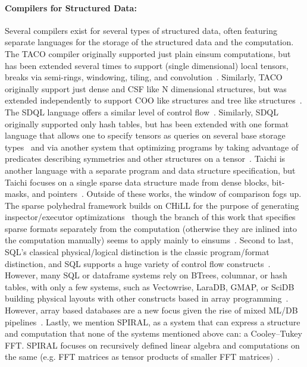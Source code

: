 \paragraph{ Compilers for Structured Data:}
Several compilers exist for several types of structured data, often featuring separate languages for the storage of the structured data and the computation.
%
The TACO compiler originally supported just plain einsum computations, but has been extended several times to support (single dimensional) local tensors, breaks via semi-rings, windowing, tiling, and convolution~\cite{kjolstad_tensor_2017, kjolstad_tensor_2019, senanayake2020sparse, henry_compilation_2021,won2023unified}.
%
Similarly, TACO originally support just dense and CSF like N dimensional structures, but was extended independently to support COO like structures and tree like structures~\cite{kjolstad_tensor_2017, chou2018format, chou2022compilation}.
%
The SDQL language offers a similar level of control flow~\cite{shaikhha2022functional}.
%
Similarly, SDQL originally supported only hash tables, but has been extended with one format language that allows one to specify tensors as queries on several base storage types~\cite{schleich2023optimizing} and via another system that optimizing programs by taking advantage of predicates describing symmetries and other structures on a tensor~\cite{ghorbani2023compiling}.
%
Taichi is another language with a separate program and data structure specification, but Taichi focuses on a single sparse data structure made from dense blocks, bit-masks, and pointers~\cite{hu_taichi_2019}.
%
Outside of these works, the window of comparison fogs up.
%
The sparse polyhedral framework builds on CHiLL for the purpose of generating inspector/executor optimizations~\cite{strout2018sparse} though the branch of this work that specifies sparse formats separately from the computation (otherwise they are inlined into the computation manually) seems to apply mainly to einsums~\cite{zhao2022polyhedral}.
%
Second to last, SQL's classical physical/logical distinction is the classic program/format distinction, and SQL supports a huge variety of control flow constructs~\cite{kotlyar1997relational, date1989guide}.
%
However, many SQL or dataframe systems rely on BTrees, columnar, or hash tables, with only a few systems, such as Vectowrise, LaraDB, GMAP, or SciDB building physical layouts with other constructs based in array programming~\cite{boncz2012vectorwise,hutchison2017laradb,  tsatalos1996gmap, stonebraker2013scidb}.
%
However, array based databases are a new focus given the rise of mixed ML/DB pipelines~\cite{baumann2021array,luo2018scalable}.
%
Lastly, we mention SPIRAL, as a system that can express a structure and computation that none of the systems mentioned above can: a Cooley–Tukey FFT. 
%
SPIRAL focuses on recursively defined linear algebra and computations on the same (e.g. FFT matrices as tensor products of smaller FFT matrices)~\cite{franchetti2018spiral,franchetti2009operator}.
%

